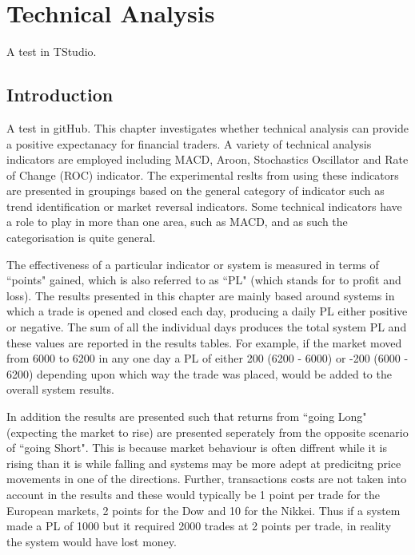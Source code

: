 
\chapter{Technical Analysis} %
 
\label{Chapter4} %


A test in TStudio.
\section{Introduction}
A test in gitHub.
This chapter investigates whether technical analysis can provide a positive expectanacy for financial traders. A variety of technical analysis indicators are employed including MACD, Aroon, Stochastics Oscillator and Rate of Change (ROC) indicator. The experimental reslts from using these indicators are presented in groupings based on the general category of indicator such as trend identification or market reversal indicators. Some technical indicators have a role to play in more than one area, such as MACD, and as such the categorisation is quite general.

The effectiveness of a particular indicator or system is measured in terms of \textquotedblleft points" gained, which is also referred to as \textquotedblleft PL" (which stands for to profit and loss). The results presented in this chapter are mainly based around systems in which a trade is opened and closed each day, producing a daily PL either positive or negative. The sum of all the individual days produces the total system PL and these values are reported in the results tables. For example, if the market moved from 6000 to 6200 in any one day a PL of either 200 (6200 - 6000) or -200 (6000 - 6200) depending upon which way the trade was placed, would be added to the overall system results. 

In addition the results are presented such that returns from \textquotedblleft going Long" (expecting the market to rise) are presented seperately from the opposite scenario of \textquotedblleft going Short". This is because  market behaviour is often diffrent while it is rising than it is while falling and systems may be more adept at predicitng price movements in one of the directions. Further, transactions costs are not taken into account in the results and these would typically be 1 point per trade for the European markets, 2 points for the Dow and 10 for the Nikkei.  Thus if a system made a PL of 1000 but it required 2000 trades at 2 points per trade, in reality the system would have lost money. 

